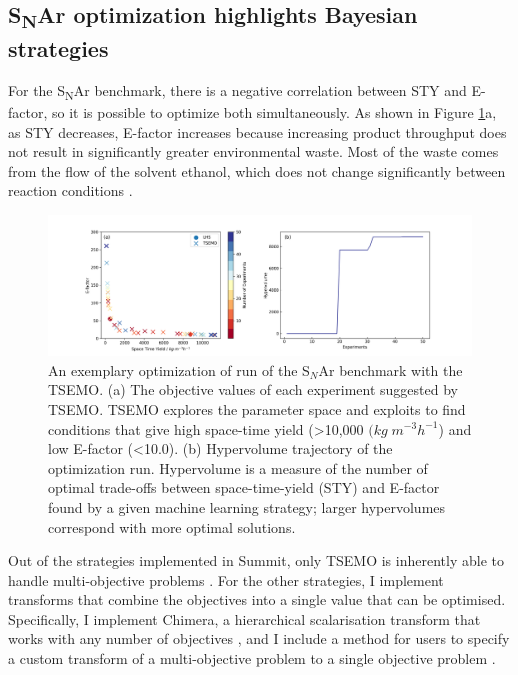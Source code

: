 \subsection{S\textsubscript{N}Ar optimization highlights Bayesian strategies}
For the S\textsubscript{N}Ar benchmark, there is a negative correlation between STY and E-factor, so it is possible to optimize both simultaneously. As shown in Figure \ref{fig:S$_N$Ar_tsemo}a, as STY decreases, E-factor increases because increasing product throughput does not result in significantly greater environmental waste. Most of the waste comes from the flow of the solvent ethanol, which does not change significantly between reaction conditions \cite{Jeraal2020}.

\begin{figure}
    \centering
    \includegraphics[width=\textwidth]{gfx/Chapter03/snar_tsemo_pareto_hv.png}
    \caption{An exemplary optimization of run of the S$_N$Ar benchmark with the TSEMO. (a) The objective values of each experiment suggested by TSEMO. TSEMO explores the parameter space and exploits to find conditions that give high space-time yield (>10,000 $(kg \; m^{-3} h^{-1}$) and low E-factor (<10.0). (b) Hypervolume trajectory of the optimization run. Hypervolume is a measure of the number of optimal trade-offs between space-time-yield (STY) and E-factor found by a given machine learning strategy; larger hypervolumes correspond with more optimal solutions.}
    \label{fig:S$_N$Ar_tsemo}
\end{figure}

Out of the strategies implemented in Summit, only TSEMO is inherently able to handle multi-objective problems \cite{Bradford2018}. For the other strategies, I implement transforms that combine the objectives into a single value that can be optimised. Specifically, I implement Chimera, a hierarchical scalarisation transform that works with any number of objectives \cite{Hase2018b}, and I include a method for users to specify a custom transform of a multi-objective problem to a single objective problem \cite{Fitzpatrick2016, Epps2020}.

